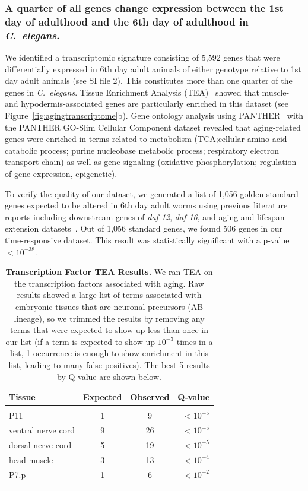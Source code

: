 \documentclass[10pt,letterpaper,twocolumn]{article}
\newcommand{\cel}{\emph{C.~elegans}}
\newcommand{\agen}{5,592}
\newcommand{\goldn}{1,056}
\newcommand{\goldfound}{506}
\newcommand{\goldpval}{$<10^{-38}$}
\newcommand{\ra}[1]{\renewcommand{\arraystretch}{#1}}
\begin{document}
\subsubsection*{A quarter of all genes change expression between the 1st day of
                adulthood and the 6th day of adulthood in \cel{}.}
We identified a transcriptomic signature consisting of \agen{} genes that were
differentially expressed in 6th day adult animals of either genotype relative
to 1st day adult animals (see SI file 2). This constitutes more than one quarter
of the genes in \cel{}. Tissue Enrichment Analysis
(TEA)~\cite{Angeles-Albores2016} showed that muscle- and hypodermis-associated
genes are particularly enriched in this dataset (see
Figure~\ref{fig:agingtranscriptome}b). Gene ontology analysis using
PANTHER~\cite{Mi2009} with the PANTHER GO-Slim Cellular Component dataset
revealed that aging-related genes were enriched in terms related to metabolism
(TCA;\@ cellular amino acid catabolic process; purine nucleobase metabolic
process; respiratory electron transport chain) as well as gene signaling
(oxidative phosphorylation; regulation of gene expression, epigenetic).

To verify the quality of our dataset, we generated a list of \goldn{} golden
standard genes expected to be altered in 6th day adult worms using previous
literature reports including downstream genes of \emph{daf-12}, \emph{daf-16},
and aging and lifespan extension datasets~\cite{Murphy2003,Halaschek-wiener2005,
Lund2002,McCormick2012,Eckley2013}. Out of \goldn{} standard genes, we found
\goldfound{} genes in our time-responsive dataset. This result was statistically
significant with a p-value \goldpval{}.

\begin{table}
\renewcommand{\familydefault}{\sfdefault}\normalfont{}
\centering{}
\ra{1.3}
\caption{\textbf{Transcription Factor TEA Results.} We ran TEA on the
transcription factors associated with aging. Raw results showed a large list of
terms associated with embryonic tissues that are neuronal precursors (AB
lineage), so we trimmed the results by removing any terms that were expected to
show up less than once in our list (if a term is expected to show up $10^{-3}$
times in a list, 1 occurrence is enough to show enrichment in this list,
leading to many false positives). The best 5 results by Q-value are shown below.}
\begin{tabular}{@{}lccr@{}}
\toprule{}
Tissue & Expected & Observed & Q-value\\
\bottomrule{}\\
P11 & 1 & 9 & $<10^{-5}$\\
ventral nerve cord &	9 &	26 &	$<10^{-5}$\\
dorsal nerve cord &	5 &	19 & $<10^{-5}$\\
head muscle & 3	& 13 &	$<10^{-4}$\\
P7.p & 1 &	6	& $<10^{-2}$\\
\bottomrule{}
\end{tabular}
\label{tab:tea_tf_age}
\end{table}
\end{document}
